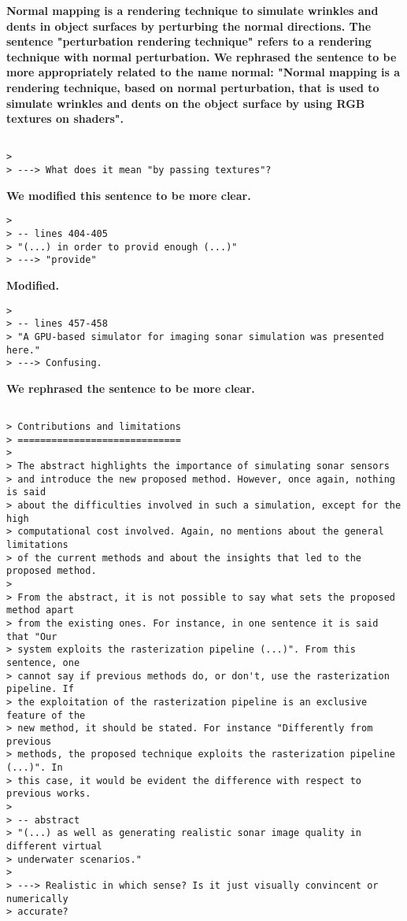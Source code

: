 \documentclass{article}
\begin{document}
\textbf{Normal mapping is a rendering technique to simulate wrinkles and dents in object surfaces by perturbing the normal directions. The sentence "perturbation rendering technique" refers to a rendering technique with normal perturbation. We rephrased the sentence to be more appropriately related to the name normal: "Normal mapping is a rendering technique, based on normal perturbation, that is used to simulate wrinkles and dents on the object surface by using RGB textures on shaders".}

\begin{verbatim}

>
> ---> What does it mean "by passing textures"?

\end{verbatim}

\textbf{We modified this sentence to be more clear.}

\begin{verbatim}
>
> -- lines 404-405
> "(...) in order to provid enough (...)"
> ---> "provide"
\end{verbatim}

\textbf{Modified.}

\begin{verbatim}
>
> -- lines 457-458
> "A GPU-based simulator for imaging sonar simulation was presented here."
> ---> Confusing.
\end{verbatim}

\textbf{We rephrased the sentence to be more clear.}

\begin{verbatim}

> Contributions and limitations
> =============================
>
> The abstract highlights the importance of simulating sonar sensors
> and introduce the new proposed method. However, once again, nothing is said
> about the difficulties involved in such a simulation, except for the high
> computational cost involved. Again, no mentions about the general limitations
> of the current methods and about the insights that led to the proposed method.
>
> From the abstract, it is not possible to say what sets the proposed method apart
> from the existing ones. For instance, in one sentence it is said that "Our
> system exploits the rasterization pipeline (...)". From this sentence, one
> cannot say if previous methods do, or don't, use the rasterization pipeline. If
> the exploitation of the rasterization pipeline is an exclusive feature of the
> new method, it should be stated. For instance "Differently from previous
> methods, the proposed technique exploits the rasterization pipeline (...)". In
> this case, it would be evident the difference with respect to previous works.
>
> -- abstract
> "(...) as well as generating realistic sonar image quality in different virtual
> underwater scenarios."
>
> ---> Realistic in which sense? Is it just visually convincent or numerically
> accurate?
\end{verbatim}
\end{document}
